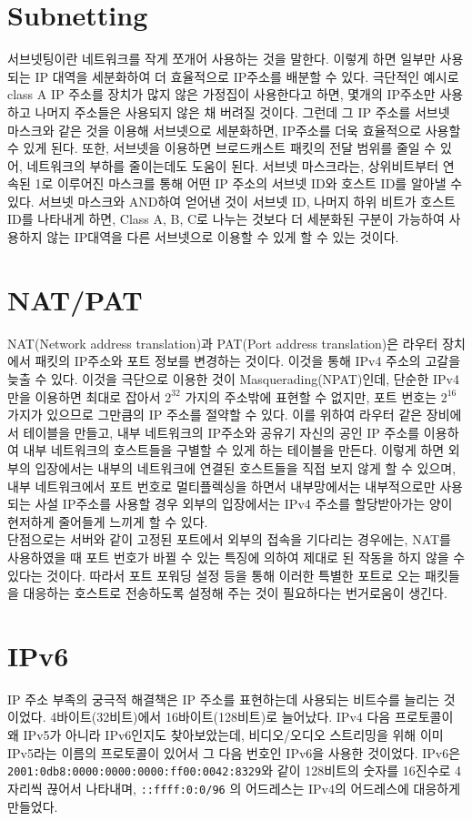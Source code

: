 \documentclass{report}
\begin{document}
\section{Subnetting}
서브넷팅이란 네트워크를 작게 쪼개어 사용하는 것을 말한다. 이렇게 하면 일부만 사용되는 IP 대역을 세분화하여 더 효율적으로 IP주소를 배분할 수 있다. 극단적인 예시로 class A IP 주소를 장치가 많지 않은 가정집이 사용한다고 하면, 몇개의 IP주소만 사용하고 나머지 주소들은 사용되지 않은 채 버려질 것이다. 그런데 그 IP 주소를 서브넷 마스크와 같은 것을 이용해 서브넷으로 세분화하면, IP주소를 더욱 효율적으로 사용할 수 있게 된다. 또한, 서브넷을 이용하면 브로드캐스트 패킷의 전달 범위를 줄일 수 있어, 네트워크의 부하를 줄이는데도 도움이 된다.
서브넷 마스크라는, 상위비트부터 연속된 1로 이루어진 마스크를 통해 어떤 IP 주소의 서브넷 ID와 호스트 ID를 알아낼 수 있다. 서브넷 마스크와 AND하여 얻어낸 것이 서브넷 ID, 나머지 하위 비트가 호스트 ID를 나타내게 하면, Class A, B, C로 나누는 것보다 더 세분화된 구분이 가능하여 사용하지 않는 IP대역을 다른 서브넷으로 이용할 수 있게 할 수 있는 것이다.

\section{NAT/PAT}
NAT(Network address translation)과 PAT(Port address translation)은 라우터 장치에서 패킷의 IP주소와 포트 정보를 변경하는 것이다. 이것을 통해 IPv4 주소의 고갈을 늦출 수 있다. 이것을 극단으로 이용한 것이 Masquerading(NPAT)인데, 단순한 IPv4만을 이용하면 최대로 잡아서 $2^{32}$ 가지의 주소밖에 표현할 수 없지만, 포트 번호는 $2^{16}$가지가 있으므로 그만큼의 IP 주소를 절약할 수 있다.
이를 위하여 라우터 같은 장비에서 테이블을 만들고, 내부 네트워크의 IP주소와 공유기 자신의 공인 IP 주소를 이용하여 내부 네트워크의 호스트들을 구별할 수 있게 하는 테이블을 만든다. 이렇게 하면 외부의 입장에서는 내부의 네트워크에 연결된 호스트들을 직접 보지 않게 할 수 있으며, 내부 네트워크에서 포트 번호로 멀티플렉싱을 하면서 내부망에서는 내부적으로만 사용되는 사설 IP주소를 사용할 경우 외부의 입장에서는 IPv4 주소를 할당받아가는 양이 현저하게 줄어들게 느끼게 할 수 있다.
\\
단점으로는 서버와 같이 고정된 포트에서 외부의 접속을 기다리는 경우에는, NAT를 사용하였을 때 포트 번호가 바뀔 수 있는 특징에 의하여 제대로 된 작동을 하지 않을 수 있다는 것이다. 따라서 포트 포워딩 설정 등을 통해 이러한 특별한 포트로 오는 패킷들을 대응하는 호스트로 전송하도록 설정해 주는 것이 필요하다는 번거로움이 생긴다.

\section{IPv6}
IP 주소 부족의 궁극적 해결책은 IP 주소를 표현하는데 사용되는 비트수를 늘리는 것이었다. 4바이트(32비트)에서 16바이트(128비트)로 늘어났다. IPv4 다음 프로토콜이 왜 IPv5가 아니라 IPv6인지도 찾아보았는데, 비디오/오디오 스트리밍을 위해 이미 IPv5라는 이름의 프로토콜이 있어서 그 다음 번호인 IPv6을 사용한 것이었다. IPv6은 \lstinline{2001:0db8:0000:0000:0000:ff00:0042:8329}와 같이 128비트의 숫자를 16진수로 4자리씩 끊어서 나타내며, \lstinline{::ffff:0:0/96} 의 어드레스는 IPv4의 어드레스에 대응하게 만들었다.
\end{document}
